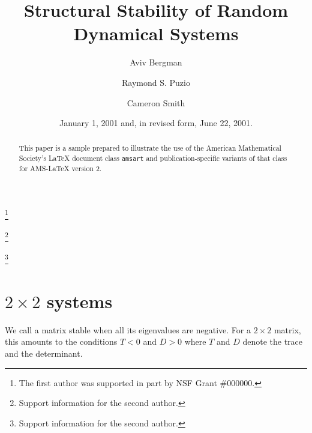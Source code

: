 \documentclass{amsart}
\theoremstyle{definition}
\theoremstyle{remark}
\numberwithin{equation}{section}
\begin{document}
\title{Structural Stability of Random Dynamical Systems}

\author{Aviv Bergman}
\address{Department of Systems and Computational Biology, Albert Einstein College of Medicine, Bronx, New York 10461}
\curraddr{}
\thanks{The first author was supported in part by NSF Grant \#000000.}

\author{Raymond S. Puzio}
\address{Department of Systems and Computational Biology, Albert Einstein College of Medicine, Bronx, New York 10461}
\curraddr{}
\thanks{Support information for the second author.}

\author{Cameron Smith}
\address{Department of Systems and Computational Biology, Albert Einstein College of Medicine, Bronx, New York 10461}
\curraddr{}
\thanks{Support information for the second author.}


\date{January 1, 2001 and, in revised form, June 22, 2001.}



\begin{abstract}
This paper is a sample prepared to illustrate the use of the American
Mathematical Society's \LaTeX{} document class \texttt{amsart} and
publication-specific variants of that class for AMS-\LaTeX{} version 2.
\end{abstract}

\maketitle

\section{$2 \times 2$ systems}
We call a matrix stable when all its eigenvalues are negative.  For a
$2 \times 2$ matrix, this amounts to the conditions $T < 0$ and $D >
0$ where $T$ and $D$ denote the trace and the determinant.
\end{document}

